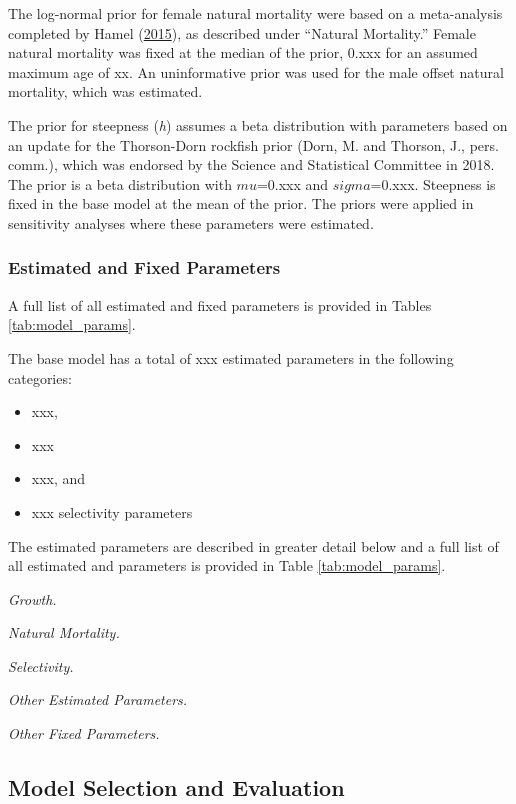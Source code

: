 \documentclass[12pt,]{article}
\begin{document}
The log-normal prior for female natural mortality were based on a
meta-analysis completed by Hamel
(\protect\hyperlink{ref-Hamel2015}{2015}), as described under ``Natural
Mortality.'' Female natural mortality was fixed at the median of the
prior, 0.xxx for an assumed maximum age of xx. An uninformative prior
was used for the male offset natural mortality, which was estimated.

The prior for steepness (\emph{h}) assumes a beta distribution with
parameters based on an update for the Thorson-Dorn rockfish prior (Dorn,
M. and Thorson, J., pers. comm.), which was endorsed by the Science and
Statistical Committee in 2018. The prior is a beta distribution with
\(mu\)=0.xxx and \(sigma\)=0.xxx. Steepness is fixed in the base model
at the mean of the prior. The priors were applied in sensitivity
analyses where these parameters were estimated.

\subsubsection{Estimated and Fixed
Parameters}\label{estimated-and-fixed-parameters}

A full list of all estimated and fixed parameters is provided in Tables
\ref{tab:model_params}.

The base model has a total of xxx estimated parameters in the following
categories:

\begin{itemize}
  \item xxx,
  \item xxx
  \item xxx, and
  \item xxx selectivity parameters
\end{itemize}

The estimated parameters are described in greater detail below and a
full list of all estimated and parameters is provided in Table
\ref{tab:model_params}.

\emph{Growth.}

\emph{Natural Mortality.}

\emph{Selectivity.}

\emph{Other Estimated Parameters.}

\emph{Other Fixed Parameters.}

\subsection{Model Selection and
Evaluation}\label{model-selection-and-evaluation}
\end{document}

